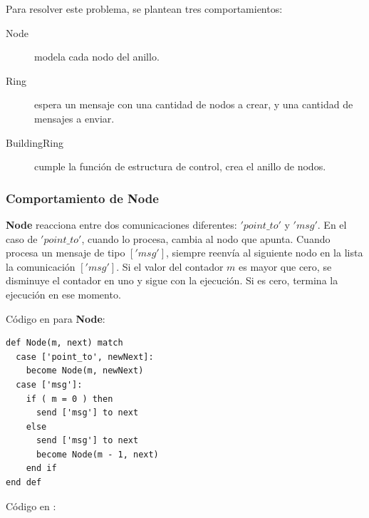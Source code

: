 Para resolver este problema, se plantean tres comportamientos:

\begin{description}
 \item [Node] modela cada nodo del anillo.
 \item [Ring] espera un mensaje con una cantidad de nodos a crear, y una cantidad de mensajes a enviar.
 \item [BuildingRing] cumple la función de estructura de control, crea el anillo de nodos.
\end{description}

\subsubsection*{Comportamiento de Node}

\textbf{Node} reacciona entre dos comunicaciones diferentes: $'point\_to'$ y $'msg'$. En el caso de $'point\_to'$, cuando lo procesa, cambia al nodo que apunta. Cuando procesa un mensaje de tipo $['msg']$, siempre reenvía al siguiente nodo en la lista la comunicación $['msg']$. Si el valor del contador $m$ es mayor que cero, se disminuye el contador en uno y sigue con la ejecución. Si es cero, termina la ejecución en ese momento.

Código en \SAL para \textbf{Node}:

\begin{lstlisting}[language=sal, style=simple]
def Node(m, next) match
  case ['point_to', newNext]:
    become Node(m, newNext)
  case ['msg']:
    if ( m = 0 ) then
      send ['msg'] to next
    else
      send ['msg'] to next
      become Node(m - 1, next)
    end if
end def
\end{lstlisting}

Código en \CSP:

